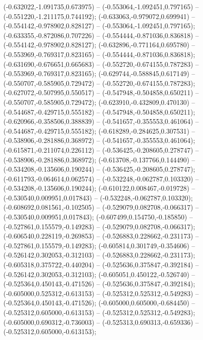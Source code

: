  (-0.632022,-1.091735,0.673975) -- (-0.553064,-1.092451,0.797165) -- (-0.551220,-1.211175,0.744192);
 (-0.633063,-0.979072,0.699941) -- (-0.554142,-0.978902,0.828127) -- (-0.553064,-1.092451,0.797165);
 (-0.633355,-0.872086,0.707226) -- (-0.554444,-0.871036,0.836818) -- (-0.554142,-0.978902,0.828127);
 (-0.632896,-0.771164,0.695780) -- (-0.553969,-0.769317,0.823165) -- (-0.554444,-0.871036,0.836818);
 (-0.631690,-0.676651,0.665683) -- (-0.552720,-0.674155,0.787283) -- (-0.553969,-0.769317,0.823165);
 (-0.629744,-0.588845,0.617149) -- (-0.550707,-0.585905,0.729472) -- (-0.552720,-0.674155,0.787283);
 (-0.627072,-0.507995,0.550517) -- (-0.547948,-0.504858,0.650211) -- (-0.550707,-0.585905,0.729472);
 (-0.623910,-0.432809,0.470130) -- (-0.544687,-0.429715,0.555182) -- (-0.547948,-0.504858,0.650211);
 (-0.620966,-0.358506,0.388839) -- (-0.541657,-0.355553,0.461064) -- (-0.544687,-0.429715,0.555182);
 (-0.618289,-0.284625,0.307531) -- (-0.538906,-0.281886,0.368972) -- (-0.541657,-0.355553,0.461064);
 (-0.615871,-0.211074,0.226112) -- (-0.536425,-0.208605,0.278747) -- (-0.538906,-0.281886,0.368972);
 (-0.613708,-0.137766,0.144490) -- (-0.534208,-0.135606,0.190244) -- (-0.536425,-0.208605,0.278747);
 (-0.611793,-0.064614,0.062574) -- (-0.532248,-0.062787,0.103320) -- (-0.534208,-0.135606,0.190244);
 (-0.610122,0.008467,-0.019728) -- (-0.530540,0.009951,0.017843) -- (-0.532248,-0.062787,0.103320);
 (-0.608692,0.081561,-0.102505) -- (-0.529079,0.082708,-0.066317) -- (-0.530540,0.009951,0.017843);
 (-0.607499,0.154750,-0.185850) -- (-0.527861,0.155579,-0.149283) -- (-0.529079,0.082708,-0.066317);
 (-0.606540,0.228119,-0.269853) -- (-0.526883,0.228662,-0.231173) -- (-0.527861,0.155579,-0.149283);
 (-0.605814,0.301749,-0.354606) -- (-0.526142,0.302053,-0.312103) -- (-0.526883,0.228662,-0.231173);
 (-0.605318,0.375722,-0.440204) -- (-0.525636,0.375847,-0.392184) -- (-0.526142,0.302053,-0.312103);
 (-0.605051,0.450122,-0.526740) -- (-0.525364,0.450143,-0.471526) -- (-0.525636,0.375847,-0.392184);
 (-0.605000,0.525312,-0.613153) -- (-0.525312,0.525312,-0.549283) -- (-0.525364,0.450143,-0.471526);
 (-0.605000,0.605000,-0.684450) -- (-0.525312,0.605000,-0.613153) -- (-0.525312,0.525312,-0.549283);
 (-0.605000,0.690312,-0.736003) -- (-0.525313,0.690313,-0.659336) -- (-0.525312,0.605000,-0.613153);
